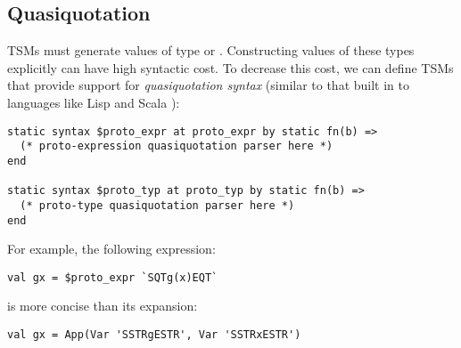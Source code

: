 \subsection{Quasiquotation}
TSMs must generate values of type  or . Constructing values of these types explicitly can have high syntactic cost. To decrease this cost, we can define TSMs that provide support for \emph{quasiquotation syntax} (similar to that built in to languages like Lisp \cite{Bawd99a} and Scala \cite{shabalin2013quasiquotes}):
\begin{lstlisting}[numbers=none]
static syntax $proto_expr at proto_expr by static fn(b) => 
  (* proto-expression quasiquotation parser here *)
end

static syntax $proto_typ at proto_typ by static fn(b) => 
  (* proto-type quasiquotation parser here *)
end
\end{lstlisting}
For example, the following expression:
\begin{lstlisting}[numbers=none]
val gx = $proto_expr `SQTg(x)EQT`
\end{lstlisting}
is more concise than its expansion:
\begin{lstlisting}[numbers=none]
val gx = App(Var 'SSTRgESTR', Var 'SSTRxESTR')
\end{lstlisting}
